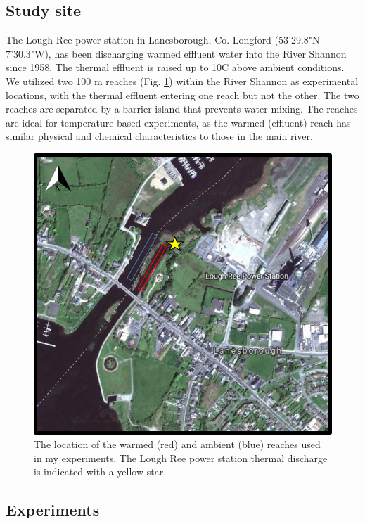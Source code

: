 \subsection{Study site}

The Lough Ree power station in Lanesborough, Co. Longford (53'29.8"N 7'30.3"W), has been discharging warmed effluent water into the River Shannon since 1958. The thermal effluent is raised up to 10\degree C above ambient conditions. We utilized two 100 m reaches (Fig. \ref{fig:shannonmap}) within the River Shannon as experimental locations, with the thermal effluent entering one reach but not the other. The two reaches are separated by a barrier island that prevents water mixing. The reaches are ideal for temperature-based experiments, as the warmed (effluent) reach has similar physical and chemical characteristics to those in the main river. 

\begin{figure}%
    \centering
    \includegraphics[scale=0.9]{figures/ch5/shannonmap.png}
  \caption [Map of thermal effluent experimental site in the River Shannon]{The location of the warmed (red) and ambient (blue) reaches used in my experiments. The Lough Ree power station thermal discharge is indicated with a yellow star.} 
    \label{fig:shannonmap}
\end{figure}

\subsection{Experiments}

